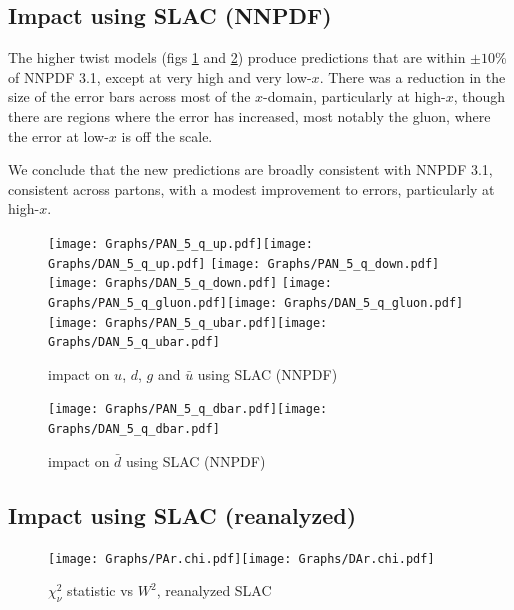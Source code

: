 \documentclass[12pt,a4paper]{report}
\begin{document}
\subsection{Impact using SLAC (NNPDF)}

The higher twist models (figs \ref{fig:res_SN_impact_a} and \ref{fig:res_SN_impact_b}) produce predictions that are within $\pm 10$\% of NNPDF 3.1, except at very high and very low-$x$. There was a reduction in the size of the error bars across most of the $x$-domain, particularly at high-$x$, though there are regions where the error has increased, most notably the gluon, where the error at low-$x$ is off the scale.

We conclude that the new predictions are broadly consistent with NNPDF 3.1, consistent across partons, with a modest improvement to errors, particularly at high-$x$.

\begin{figure}[H]
\begin{center}
\texttt{[image: Graphs/PAN\_5\_q\_up.pdf]}\texttt{[image: Graphs/DAN\_5\_q\_up.pdf]}
\texttt{[image: Graphs/PAN\_5\_q\_down.pdf]}\texttt{[image: Graphs/DAN\_5\_q\_down.pdf]}
\texttt{[image: Graphs/PAN\_5\_q\_gluon.pdf]}\texttt{[image: Graphs/DAN\_5\_q\_gluon.pdf]}
\texttt{[image: Graphs/PAN\_5\_q\_ubar.pdf]}\texttt{[image: Graphs/DAN\_5\_q\_ubar.pdf]}
\caption{impact on $u$, $d$, $g$ and $\bar{u}$ using SLAC (NNPDF)}
\label{fig:res_SN_impact_a}
\end{center}
\end{figure}

\begin{figure}[H]
\begin{center}
\texttt{[image: Graphs/PAN\_5\_q\_dbar.pdf]}\texttt{[image: Graphs/DAN\_5\_q\_dbar.pdf]}
\caption{impact on $\bar{d}$ using SLAC (NNPDF)}
\label{fig:res_SN_impact_b}
\end{center}
\end{figure}

\subsection{Impact using SLAC (reanalyzed)} \label{sec:ht_impact_reanalyzed}

\begin{figure}[H]
\begin{center}
\texttt{[image: Graphs/PAr.chi.pdf]}\texttt{[image: Graphs/DAr.chi.pdf]}\\
\caption{$\chi_\nu^2$ statistic vs $W^2$, reanalyzed SLAC}
\label{fig:res_validate_reanalyzed}
\end{center}
\end{figure}
\end{document}
